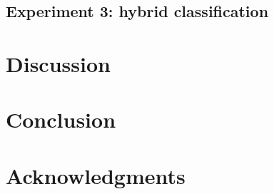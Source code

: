 \documentclass[10pt]{article}
\begin{document}
    \subsection{Experiment 3: hybrid classification}
    \label{sec:2.4Hybrid}


\section{Discussion}
\label{sec:4Discuss}

\section{Conclusion}
\label{sec:6Conclusion}

\section*{Acknowledgments}

\printbibliography

%



\end{document}
